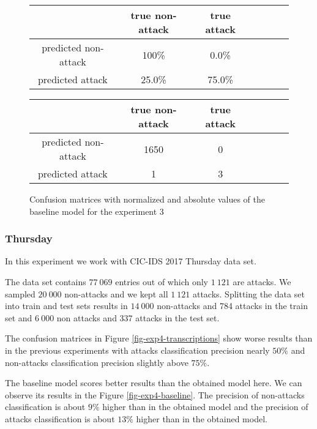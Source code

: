 \documentclass{article}
\begin{document}
\begin{figure}[h!]
    \centering
    \begin{tabular}{ |c|c|c|c|c|c|c| }
     \hline
      & true non-attack & true attack \\
     \hline
     predicted non-attack & 100\% & 0.0\% \\
     \hline
     predicted attack & 25.0\% & 75.0\% \\
     \hline
    \end{tabular}

    \vspace{0.2cm}

    \centering
    \begin{tabular}{ |c|c|c|c|c|c|c| }
     \hline
      & true non-attack & true attack \\
     \hline
     predicted non-attack & 1650 & 0 \\
     \hline
     predicted attack & 1 & 3 \\
     \hline
    \end{tabular}
    \caption{Confusion matrices with normalized and absolute values of the baseline model for the experiment 3}
    \label{fig-exp3-baseline}
\end{figure}

\clearpage


\subsubsection{Thursday}
In this experiment we work with CIC-IDS 2017 Thursday data set.

The data set contains $77\ 069$ entries out of which only $1\ 121$ are attacks. We sampled $20\ 000$ non-attacks and we kept all $1\ 121$ attacks. Splitting the data set into train and test sets results in $14\ 000$ non-attacks and 784 attacks in the train set and $6\ 000$ non attacks and 337 attacks in the test set.

The confusion matrices in Figure \ref{fig-exp4-transcriptions} show worse results than in the previous experiments with attacks classification precision nearly $50\%$ and non-attacks classification precision slightly above $75\%$.

The baseline model scores better results than the obtained model here. We can observe its results in the Figure \ref{fig-exp4-baseline}. The precision of non-attacks classification is about $9\%$ higher than in the obtained model and the precision of attacks classification is about $13\%$ higher than in the obtained model.
\end{document}
